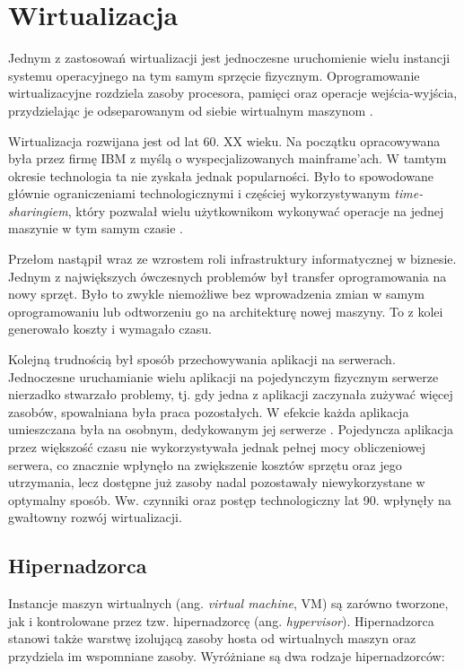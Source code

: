 \chapter{Wirtualizacja}

Jednym z zastosowań wirtualizacji jest jednoczesne uruchomienie wielu instancji systemu operacyjnego na tym samym sprzęcie fizycznym. Oprogramowanie wirtualizacyjne rozdziela zasoby procesora, pamięci oraz operacje wejścia-wyjścia, przydzielając je odseparowanym od siebie wirtualnym maszynom \cite{biblia_linux}.

Wirtualizacja rozwijana jest od lat 60. XX wieku. Na początku opracowywana była przez firmę IBM z myślą o wyspecjalizowanych mainframe'ach. W tamtym okresie technologia ta nie zyskała jednak popularności. Było to spowodowane głównie ograniczeniami technologicznymi i częściej wykorzystywanym \textit{time-sharingiem}, który pozwalał wielu użytkownikom wykonywać operacje na jednej maszynie w tym samym czasie \cite{idkrtm, arundel}. 

Przełom nastąpił wraz ze wzrostem roli infrastruktury informatycznej w biznesie. Jednym z największych ówczesnych problemów był transfer oprogramowania na nowy sprzęt. Było to zwykle niemożliwe bez wprowadzenia zmian w samym oprogramowaniu lub odtworzeniu go na architekturę nowej maszyny. To z kolei generowało koszty i wymagało czasu. 

Kolejną trudnością był sposób przechowywania aplikacji na serwerach. Jednoczesne uruchamianie wielu aplikacji na pojedynczym fizycznym serwerze nierzadko stwarzało problemy, tj. gdy jedna z aplikacji zaczynała zużywać więcej zasobów, spowalniana była praca pozostałych. W efekcie każda aplikacja umieszczana była na osobnym, dedykowanym jej serwerze \cite{ibm, kubernetes}. Pojedyncza aplikacja przez większość czasu nie wykorzystywała jednak pełnej mocy obliczeniowej serwera, co znacznie wpłynęło na zwiększenie kosztów sprzętu oraz jego utrzymania, lecz dostępne już zasoby nadal pozostawały niewykorzystane w optymalny sposób. Ww. czynniki oraz postęp technologiczny lat 90. wpłynęły na gwałtowny rozwój wirtualizacji.

\section{Hipernadzorca}
Instancje maszyn wirtualnych (ang. \textit{virtual machine}, VM) są zarówno tworzone, jak i kontrolowane przez tzw. hipernadzorcę (ang. \textit{hypervisor}). Hipernadzorca stanowi także warstwę izolującą zasoby hosta od wirtualnych maszyn oraz przydziela im wspomniane zasoby. Wyróżniane są dwa rodzaje hipernadzorców:

